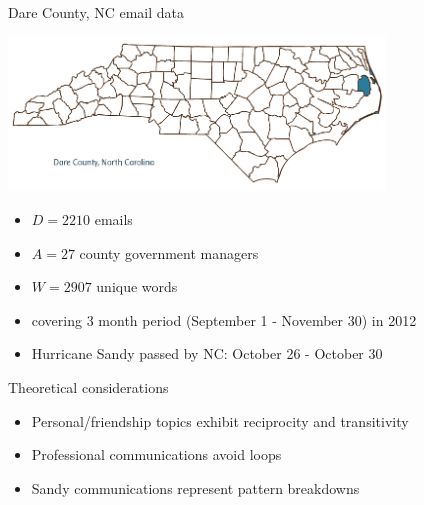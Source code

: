 \documentclass[10pt, xcolor=table]{beamer}
\theoremstyle{definition}
\theoremstyle{remark}
\begin{document}
\begin{frame}{Dare County, NC email data}
\begin{center} 
\includegraphics[width=0.75\textwidth]{figures/Dare.png}
\end{center}
 \begin{itemize}
 \item $D = 2210$ emails
\item  $A = 27$ county government managers
\item  $W = 2907$ unique words
\item  covering 3 month period (September 1 - November 30) in 2012
\item Hurricane Sandy passed by NC: October 26 - October 30
 \end{itemize}
\end{frame}


\begin{frame}{Theoretical considerations}
\large
\begin{itemize}
\item Personal/friendship topics exhibit reciprocity and transitivity \vspace{.4cm}
\item Professional communications avoid loops  \vspace{.4cm}
\item Sandy communications represent pattern breakdowns
\end{itemize}

\end{frame}
\end{document}
